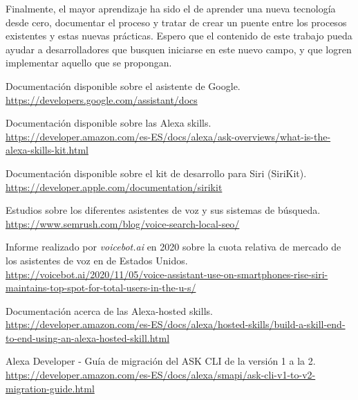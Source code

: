 \documentclass[11pt,spanish,listoffigures,listoftables,table,hyphens,dvipsnames]{tfgetsinf}
\newcommand{\fe}[1]{\foreign{english}{#1}}
\begin{document}
Finalmente, el mayor aprendizaje ha sido el de aprender una nueva tecnología desde cero, documentar el proceso y tratar de crear un puente entre los procesos existentes y estas nuevas prácticas. Espero que el contenido de este trabajo pueda ayudar a desarrolladores que busquen iniciarse en este nuevo campo, y que logren implementar aquello que se propongan.



\begin{thebibliography}{10}

   Documentación disponible sobre el asistente de Google.\\
   \newblock \url{https://developers.google.com/assistant/docs}

   Documentación disponible sobre las Alexa skills.\\
   \newblock \url{https://developer.amazon.com/es-ES/docs/alexa/ask-overviews/what-is-the-alexa-skills-kit.html}

   Documentación disponible sobre el kit de desarrollo para Siri (SiriKit).\\
   \newblock \url{https://developer.apple.com/documentation/sirikit}

   Estudios sobre los diferentes asistentes de voz y sus sistemas de búsqueda.\\
   \newblock \url{https://www.semrush.com/blog/voice-search-local-seo/}
   
   Informe realizado por \emph{voicebot.ai} en 2020 sobre la cuota relativa de mercado de los asistentes de voz en \fe{smartphones} de Estados Unidos.\\
   \newblock \url{https://voicebot.ai/2020/11/05/voice-assistant-use-on-smartphones-rise-siri-maintains-top-spot-for-total-users-in-the-u-s/}

   Documentación acerca de las Alexa-hosted skills.\\
   \newblock \url{https://developer.amazon.com/es-ES/docs/alexa/hosted-skills/build-a-skill-end-to-end-using-an-alexa-hosted-skill.html}

   Alexa Developer - Guía de migración del ASK CLI de la versión 1 a la 2.\\
   \newblock \url{https://developer.amazon.com/es-ES/docs/alexa/smapi/ask-cli-v1-to-v2-migration-guide.html}


\end{thebibliography}
\end{document}
